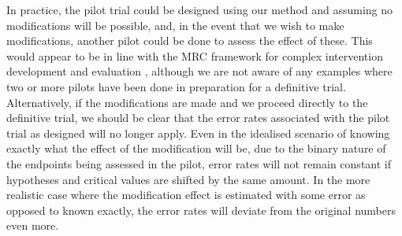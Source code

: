 \documentclass[AMA,STIX1COL]{WileyNJD-v2}
\begin{document}
In practice, the pilot trial could be designed using our method and assuming no modifications will be possible, and, in the event that we wish to make modifications, another pilot could be done to assess the effect of these. This would appear to be in line with the MRC framework for complex intervention development and evaluation \cite{Craig2008}, although we are not aware of any examples where two or more pilots have been done in preparation for a definitive trial. Alternatively, if the modifications are made and we proceed directly to the definitive trial, we should be clear that the error rates associated with the pilot trial as designed will no longer apply. Even in the idealised scenario of knowing exactly what the effect of the modification will be, due to the binary nature of the endpoints being assessed in the pilot, error rates will not remain constant if hypotheses and critical values are shifted by the same amount. 
In the more realistic case where the modification effect is estimated with some error as opposed to known exactly, the error rates will deviate from the original numbers even more. 

\end{document}
